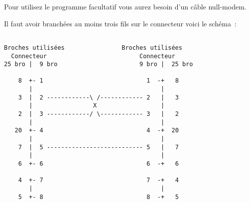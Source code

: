 

    Pour utilisez le programme facultatif  vous
    aurez besoin d'un câble null-modem.

    Il faut avoir branchées au moins trois fils sur le connecteur
    voici le schéma~:

\begin{example}
%
\begin{verbatim}

Broches utilisées                Broches utilisées
  Connecteur                          Connecteur
25 bro |  9 bro                       9 bro |  25 bro

    8  +- 1                             1  -+   8
       |                                    |
    3  |  2 ------------\ /------------ 2   |   3
       |                 X                  |
    2  |  3 ------------/ \------------ 3   |   2
       |                                    |
   20  +- 4                             4  -+  20
       |                                    |
    7  |  5 --------------------------- 5   |   7
       |                                    |
    6  +- 6                             6  -+   6

    4  +- 7                             7  -+   4
       |                                    |
    5  +- 8                             8  -+   5
\end{verbatim}
\end{example}

